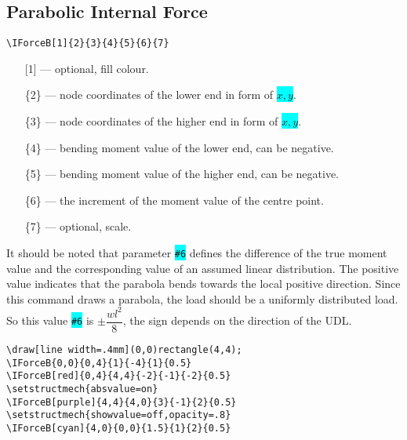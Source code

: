 \documentclass[10pt,a4paper]{article}
\newcommand*{\Highlight}[1]{\colorbox{cyan}{\color{red}\texttt{#1}}}
\begin{document}
\subsection{Parabolic Internal Force}
\begin{Verbatim}[frame=single,label=Syntax]
\IForceB[1]{2}{3}{4}{5}{6}{7}
\end{Verbatim}
\begin{enumerate}
\item[][1] --- optional, fill colour.
\item[]\{2\} --- node coordinates of the lower end in form of \Highlight{$x,y$}.
\item[]\{3\} --- node coordinates of the higher end in form of \Highlight{$x,y$}.
\item[]\{4\} --- bending moment value of the lower end, can be negative.
\item[]\{5\} --- bending moment value of the higher end, can be negative.
\item[]\{6\} --- the increment of the moment value of the centre point.
\item[]\{7\} --- optional, scale.
\end{enumerate}
It should be noted that parameter \Highlight{\#6} defines the difference of the true moment value and the corresponding value of an assumed linear distribution. The positive value indicates that the parabola bends towards the local positive direction. Since this command draws a parabola, the load should be a uniformly distributed load. So this value \Highlight{\#6} is $\pm\dfrac{wl^2}{8}$, the sign depends on the direction of the UDL.
\begin{Verbatim}[frame=single,label=Example]
\draw[line width=.4mm](0,0)rectangle(4,4);
\IForceB{0,0}{0,4}{1}{-4}{1}{0.5}
\IForceB[red]{0,4}{4,4}{-2}{-1}{-2}{0.5}
\setstructmech{absvalue=on}
\IForceB[purple]{4,4}{4,0}{3}{-1}{2}{0.5}
\setstructmech{showvalue=off,opacity=.8}
\IForceB[cyan]{4,0}{0,0}{1.5}{1}{2}{0.5}
\end{Verbatim}
\begin{figure}[H]
\centering
{}
\end{figure}
\end{document}
